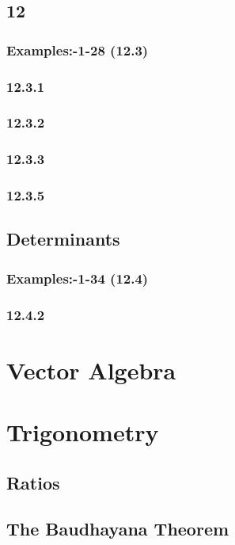 \documentclass[11pt]{book}
\begin{document}
\section{12}
\subsection{Examples:-1-28 (12.3)}

\subsection{12.3.1}

\subsection{12.3.2}

\subsection{12.3.3}

\subsection{12.3.5}

\section{Determinants}
\subsection{Examples:-1-34 (12.4)}

\subsection{12.4.2}

\chapter{Vector Algebra}
\chapter{Trigonometry}
\section{Ratios}

\section{The Baudhayana Theorem}

%
\end{document}
